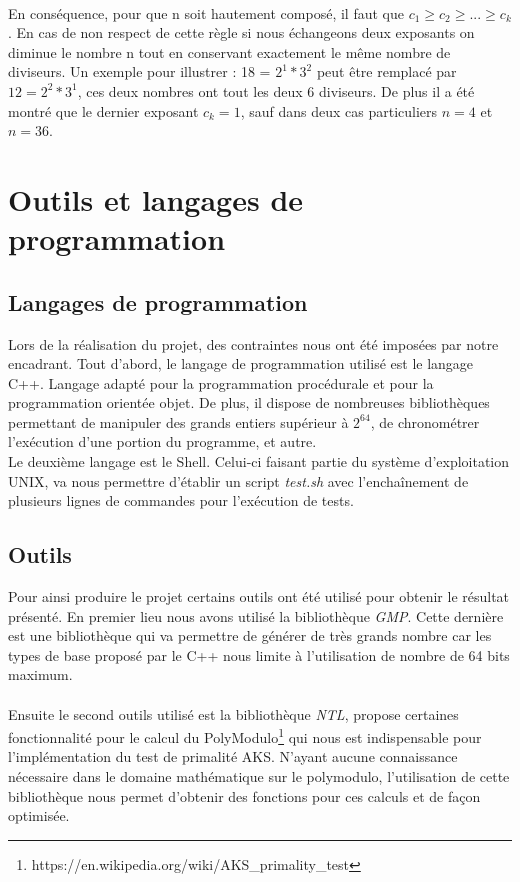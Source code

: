 		\paragraph{}En conséquence, pour que n soit hautement composé, il faut que $c_1 \ge c_2 \ge ... \ge c_k$. En cas de non respect de cette règle si nous échangeons deux exposants on diminue le nombre n tout en conservant exactement le même nombre de diviseurs. Un exemple pour illustrer : 18 = $2^1 * 3^2$ peut être remplacé par $12 = 2^2 * 3^1$, ces deux nombres ont tout les deux 6 diviseurs. De plus il a été montré que le dernier exposant $c_k = 1$, sauf dans deux cas particuliers $n = 4$ et $n = 36$.

	\section{Outils et langages de programmation}
		\subsection{Langages de programmation}
		Lors de la réalisation du projet, des contraintes nous ont été imposées par notre encadrant. Tout d'abord, le langage de programmation utilisé est le langage C++. Langage adapté pour la programmation procédurale et pour la programmation orientée objet. De plus, il dispose de nombreuses bibliothèques permettant de manipuler des grands entiers supérieur à $2^{64}$, de chronométrer l'exécution d'une portion du programme, et autre.\\
		Le deuxième langage est le Shell. Celui-ci faisant partie du système d'exploitation UNIX, va nous permettre d'établir un script \textit{test.sh} avec l’enchaînement de plusieurs lignes de commandes pour l'exécution de tests.
		
		\subsection{Outils}
		Pour ainsi produire le projet certains outils ont été utilisé pour obtenir le résultat présenté. En premier lieu nous avons utilisé la bibliothèque \textit{GMP}.  Cette dernière est une bibliothèque qui va permettre de générer de très grands nombre car les types de base proposé par le C++ nous limite à l'utilisation de nombre de 64 bits maximum.
		\paragraph{}Ensuite le second outils utilisé est la bibliothèque \textit{NTL}, propose certaines fonctionnalité pour le calcul du PolyModulo\footnote{https://en.wikipedia.org/wiki/AKS\_primality\_test} qui nous est indispensable pour l'implémentation du test de primalité AKS. N'ayant aucune connaissance nécessaire dans le domaine mathématique sur le polymodulo, l'utilisation de cette bibliothèque nous permet d'obtenir des fonctions pour ces calculs et de façon optimisée.  
